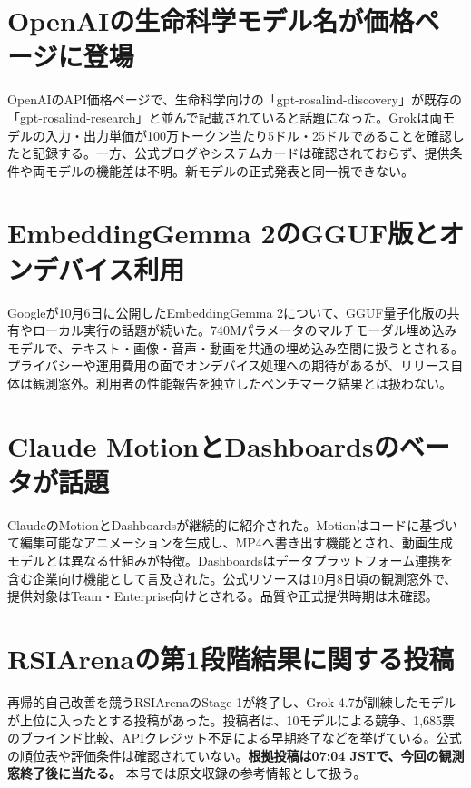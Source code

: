 \section{OpenAIの生命科学モデル名が価格ページに登場}
OpenAIのAPI価格ページで、生命科学向けの「gpt-rosalind-discovery」が既存の「gpt-rosalind-research」と並んで記載されていると話題になった。Grokは両モデルの入力・出力単価が100万トークン当たり5ドル・25ドルであることを確認したと記録する。一方、公式ブログやシステムカードは確認されておらず、提供条件や両モデルの機能差は不明。新モデルの正式発表と同一視できない。

\section{EmbeddingGemma 2のGGUF版とオンデバイス利用}
Googleが10月6日に公開したEmbeddingGemma 2について、GGUF量子化版の共有やローカル実行の話題が続いた。740Mパラメータのマルチモーダル埋め込みモデルで、テキスト・画像・音声・動画を共通の埋め込み空間に扱うとされる。プライバシーや運用費用の面でオンデバイス処理への期待があるが、リリース自体は観測窓外。利用者の性能報告を独立したベンチマーク結果とは扱わない。

\section{Claude MotionとDashboardsのベータが話題}
ClaudeのMotionとDashboardsが継続的に紹介された。Motionはコードに基づいて編集可能なアニメーションを生成し、MP4へ書き出す機能とされ、動画生成モデルとは異なる仕組みが特徴。Dashboardsはデータプラットフォーム連携を含む企業向け機能として言及された。公式リソースは10月8日頃の観測窓外で、提供対象はTeam・Enterprise向けとされる。品質や正式提供時期は未確認。

\section{RSIArenaの第1段階結果に関する投稿}
再帰的自己改善を競うRSIArenaのStage 1が終了し、Grok 4.7が訓練したモデルが上位に入ったとする投稿があった。投稿者は、10モデルによる競争、1,685票のブラインド比較、APIクレジット不足による早期終了などを挙げている。公式の順位表や評価条件は確認されていない。\textbf{根拠投稿は07:04 JSTで、今回の観測窓終了後に当たる。} 本号では原文収録の参考情報として扱う。

